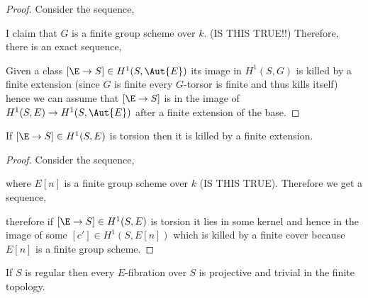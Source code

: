 \documentclass[12pt]{article}
\begin{document}
\begin{proof}
Consider the sequence,
\begin{center}
\end{center}
I claim that $G$ is a finite \etale group scheme over $k$. (IS THIS TRUE!!) Therefore, there is an exact sequence,
\begin{center}
\end{center}
Given a class $[\E \to S] \in H^1(S, \Aut{E})$ its image in $H^1(S, G)$ is killed by a finite \etale extension (since $G$ is finite \etale every $G$-torsor is finite \etale and thus kills itself) hence we can assume that $[\E \to S]$ is in the image of $H^1(S, E) \to H^1(S, \Aut{E})$ after a finite \etale extension of the base.
\end{proof}

\begin{lemma}
If $[\E \to S] \in H^1(S, E)$ is torsion then it is killed by a finite \etale extension.
\end{lemma}

\begin{proof}
Consider the sequence,
\begin{center}
\end{center}
where $E[n]$ is a finite \etale group scheme over $k$ (IS THIS TRUE). Therefore we get a sequence,
\begin{center}
\end{center}
therefore if $[\E \to S] \in H^1(S, E)$ is torsion it lies in some kernel and hence in the image of some $[c'] \in H^1(S, E[n])$ which is killed by a finite \etale cover because $E[n]$ is a finite \etale group scheme.
\end{proof}

\begin{prop}
If $S$ is regular then every $E$-fibration over $S$ is projective and trivial in the finite \etale topology. 
\end{prop}
\end{document}
